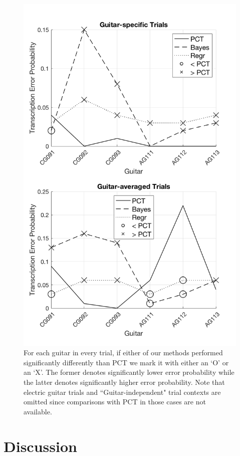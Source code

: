 \documentclass[convention,peer-reviewed]{aesconf}
\begin{document}
\begin{figure}[!h]
\centering
\includegraphics[scale=0.25]{sig-comp-PCT}
\caption{For each guitar in every trial, if either of our methods performed significantly differently than PCT we mark it with either an `O' or an `X'. The former denotes significantly lower error probability while the latter denotes significantly higher error probability. Note that electric guitar trials and ``Guitar-independent" trial contexts are omitted since comparisons with PCT in those cases are not available.}
\label{fig:sig-comp-PCT}
\end{figure}


\section{Discussion} 
\end{document}
